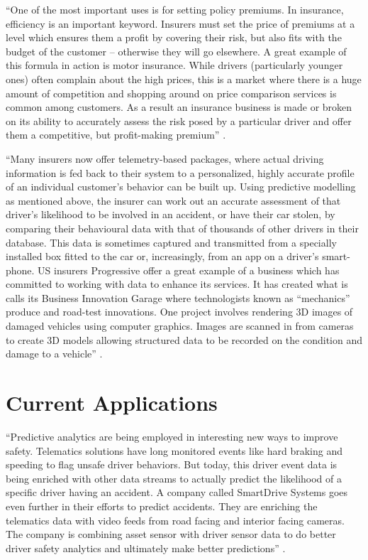 ``One of the most important uses is for setting policy premiums. In insurance, efficiency is an important keyword. Insurers must set the price of premiums at a level which ensures them a profit by covering their risk, but also fits with the budget of the customer – otherwise they will go elsewhere. A great example of this formula in action is motor insurance. While drivers (particularly younger ones) often complain about the high prices, this is a market where there is a huge amount of competition and shopping around on price comparison services is common among customers. As a result an insurance business is made or broken on its ability to accurately assess the risk posed by a particular driver and offer them a competitive, but profit-making premium'' \cite{Marr2015forever}.

``Many insurers now offer telemetry-based packages, where actual driving information is fed back to their system to a personalized, highly accurate profile of an individual customer’s behavior can be built up. Using predictive modelling as mentioned above, the insurer can work out an accurate assessment of that driver’s likelihood to be involved in an accident, or have their car stolen, by comparing their behavioural data with that of thousands of other drivers in their database. This data is sometimes captured and transmitted from a specially installed box fitted to the car or, increasingly, from an app on a driver’s smart-phone. US insurers Progressive offer a great example of a business which has committed to working with data to enhance its services. It has created what is calls its Business Innovation Garage where technologists known as “mechanics” produce and road-test innovations. One project involves rendering 3D images of damaged vehicles using computer graphics. Images are scanned in from cameras to create 3D models allowing structured data to be recorded on the condition and damage to a vehicle'' \cite{Marr2015forever}.

\section{Current Applications}

``Predictive analytics are being employed in interesting new ways to improve safety. Telematics solutions have long monitored events like hard braking and speeding to flag unsafe driver behaviors.  But today, this driver event data is being enriched with other data streams to actually predict the likelihood of a specific driver having an accident. A company called SmartDrive Systems goes even further in their efforts to predict accidents.  They are enriching the telematics data with video feeds from road facing and interior facing cameras.  The company is combining asset sensor with driver sensor data to do better driver safety analytics and ultimately make better predictions'' \cite{Banker2016accident}.


